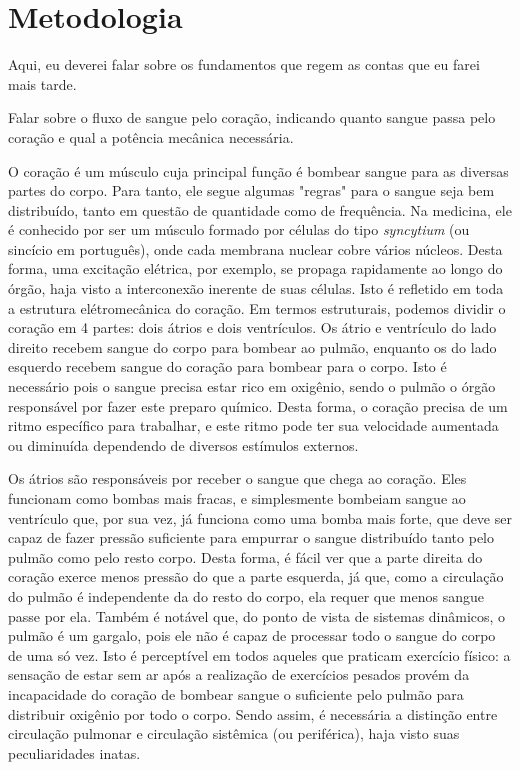 \documentclass[12pt, a4paper, twoside]{article}
\begin{document}
\section{Metodologia}

Aqui, eu deverei falar sobre os fundamentos que regem as contas que eu farei mais tarde.

Falar sobre o fluxo de sangue pelo coração, indicando quanto sangue passa pelo coração e qual a potência mecânica necessária.

O coração é um músculo cuja principal função é bombear sangue para as diversas partes do corpo. Para tanto, ele segue algumas "regras" para o sangue seja bem distribuído, tanto em questão de quantidade como de frequência. Na medicina, ele é conhecido por ser um músculo formado por células do tipo \textit{syncytium} (ou sincício em português), onde cada membrana nuclear cobre vários núcleos. Desta forma, uma excitação elétrica, por exemplo, se propaga rapidamente ao longo do órgão, haja visto a interconexão inerente de suas células. Isto é refletido em toda a estrutura elétromecânica do coração. Em termos estruturais, podemos dividir o coração em 4 partes: dois átrios e dois ventrículos. Os átrio e ventrículo do lado direito recebem sangue do corpo para bombear ao pulmão, enquanto os do lado esquerdo recebem sangue do coração para bombear para o corpo. Isto é necessário pois o sangue precisa estar rico em oxigênio, sendo o pulmão o órgão responsável por fazer este preparo químico. Desta forma, o coração precisa de um ritmo específico para trabalhar, e este ritmo pode ter sua velocidade aumentada ou diminuída dependendo de diversos estímulos externos.

Os átrios são responsáveis por receber o sangue que chega ao coração. Eles funcionam como bombas mais fracas, e simplesmente bombeiam sangue ao ventrículo que, por sua vez, já funciona como uma bomba mais forte, que deve ser capaz de fazer pressão suficiente para empurrar o sangue distribuído tanto pelo pulmão como pelo resto corpo. Desta forma, é fácil ver que a parte direita do coração exerce menos pressão do que a parte esquerda, já que, como a circulação do pulmão é independente da do resto do corpo, ela requer que menos sangue passe por ela. Também é notável que, do ponto de vista de sistemas dinâmicos, o pulmão é um gargalo, pois ele não é capaz de processar todo o sangue do corpo de uma só vez. Isto é perceptível em todos aqueles que praticam exercício físico: a sensação de estar sem ar após a realização de exercícios pesados provém da incapacidade do coração de bombear sangue o suficiente pelo pulmão para distribuir oxigênio por todo o corpo. Sendo assim, é necessária a distinção entre circulação pulmonar e circulação sistêmica (ou periférica), haja visto suas peculiaridades inatas.
\end{document}
